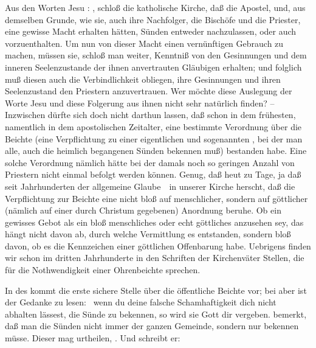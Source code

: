 Aus den Worten Jesu : , schloß die katholische Kirche, daß die Apostel, und, aus demselben Grunde, wie sie, auch ihre Nachfolger, die Bischöfe und die Priester, eine gewisse Macht erhalten hätten, Sünden entweder nachzulassen, oder auch vorzuenthalten. Um nun von dieser Macht einen vernünftigen Gebrauch zu machen, müssen sie, schloß man weiter, Kenntniß von den Gesinnungen und dem inneren Seelenzustande der ihnen anvertrauten Gläubigen erhalten; und folglich muß diesen auch die Verbindlichkeit obliegen, ihre Gesinnungen und ihren Seelenzustand den Priestern anzuvertrauen. Wer möchte diese Auslegung der Worte Jesu und diese Folgerung aus ihnen nicht sehr natürlich finden? -- Inzwischen dürfte sich doch nicht darthun lassen, daß schon in dem frühesten, namentlich in dem apostolischen Zeitalter, eine bestimmte Verordnung über die Beichte (eine Verpflichtung zu einer eigentlichen und sogenannten , bei der man alle, auch die heimlich begangenen Sünden bekennen muß) bestanden habe. Eine solche Verordnung nämlich hätte bei der damals noch so geringen Anzahl von Priestern nicht einmal befolgt werden können. Genug, daß heut zu Tage, ja daß seit Jahrhunderten der allgemeine Glaube~\ in unserer Kirche herscht, daß die Verpflichtung zur Beichte eine nicht bloß auf menschlicher, sondern auf göttlicher (nämlich auf einer durch Christum gegebenen) Anordnung beruhe. Ob ein gewisses Gebot als ein bloß menschliches oder echt göttliches anzusehen sey, das hängt nicht davon ab, durch welche Vermittlung es entstanden, sondern bloß davon, ob es die Kennzeichen einer göttlichen Offenbarung habe. Uebrigens finden wir schon im dritten Jahrhunderte in den Schriften der Kirchenväter Stellen, die für die Nothwendigkeit einer Ohrenbeichte sprechen.\par
In des   kommt die erste sichere Stelle über die öffentliche Beichte vor; bei  aber  ist der Gedanke zu lesen:  \dh\  wenn du deine falsche Schamhaftigkeit dich nicht abhalten lässest, die Sünde zu bekennen, so wird sie Gott dir vergeben.  bemerkt, daß man die Sünden nicht immer der ganzen Gemeinde, sondern nur  bekennen müsse. Dieser mag urtheilen, . Und  schreibt er: \par
